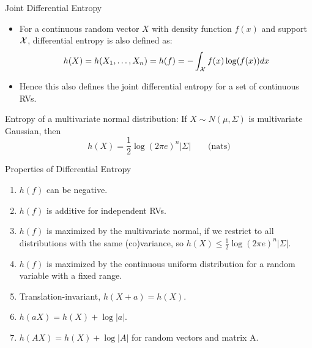 \documentclass[11pt,compress,t,notes=noshow, xcolor=table]{beamer}
\begin{document}
\begin{vbframe}{Joint Differential Entropy} 
\begin{itemize}
\item For a continuous random vector $X$ with density function $f(x)$ and support $\mathcal{X}$, 
  differential entropy is also defined as:
$$ h(X) = h(X_1, \ldots, X_n) = h(f) = - \int_{\mathcal{X}} f(x) \log(f(x)) dx $$
\item Hence this also defines the joint differential entropy for a set of continuous RVs.
\end{itemize}

\lz
  
Entropy of a multivariate normal distribution: 
If $X \sim N(\mu, \Sigma)$ is multivariate Gaussian, then
  $$h(X) = \frac{1}{2} \log(2 \pi e)^n |\Sigma| \qquad \text{(nats)}$$
\end{vbframe}

\begin{vbframe}{Properties of Differential Entropy} 
\begin{enumerate}
  \item $h(f)$ can be negative.
  \item $h(f)$ is additive for independent RVs.
  \item $h(f)$ is maximized by the multivariate normal, if we restrict 
    to all distributions with the same (co)variance, so
    $h(X) \leq \frac{1}{2} \log(2 \pi e)^n |\Sigma|.$
    \item $h(f)$ is maximized by the continuous uniform distribution for a random variable with a fixed range.
\item Translation-invariant, $ h(X+a) = h(X)$. 
\item $h(aX) = h(X) + \log |a|$.
\item $h(AX) = h(X) + \log |A|$ for random vectors and matrix A.
\end{enumerate}
\end{vbframe}

\endlecture
\end{document}
